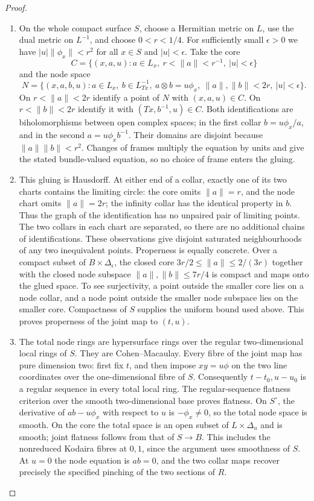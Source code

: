 \begin{proof}
\begin{enumerate}[label=\arabic*.,leftmargin=*]
\item On the whole compact surface $S$, choose a
Hermitian metric on $L$, use the dual metric on $L^{-1}$, and choose
$0<r<1/4$. For sufficiently small $\epsilon>0$ we have
$|u|\|\phi_x\|<r^2$ for all $x\in S$ and $|u|<\epsilon$.
Take the core
\[
 C=\{(x,a,u):a\in L_x,\ r<\|a\|<r^{-1},\ |u|<\epsilon\}
\]
and the node space
\begin{equation}
 N=\{(x,a,b,u):a\in L_x,\ b\in L^{-1}_{Tx},\
 a\otimes b=u\phi_x,\ \|a\|,\|b\|<2r,\ |u|<\epsilon\}.
\label{pub:I:eq:E1}
\end{equation}
On $r<\|a\|<2r$ identify a point of $N$ with $(x,a,u)\in C$.
On $r<\|b\|<2r$ identify it with $(Tx,b^{-1},u)\in C$.
Both identifications are biholomorphisms between open complex spaces;
in the first collar $b=u\phi_x/a$, and in the second
$a=u\phi_xb^{-1}$. Their domains are disjoint because
$\|a\|\|b\|<r^2$. Changes of frames multiply the equation by
units and give the stated bundle-valued equation, so no choice of
frame enters the gluing.

\item This gluing is Hausdorff. At either end of a collar, exactly one
of its two charts contains the limiting circle: the core omits
$\|a\|=r$, and the node chart omits $\|a\|=2r$; the infinity
collar has the identical property in $b$. Thus the graph of the
identification has no unpaired pair of limiting points. The two
collars in each chart are separated, so there are no additional
chains of identifications. These observations give disjoint
saturated neighbourhoods of any two inequivalent points. Properness
is equally concrete. Over a compact subset of $B\times\Delta_\epsilon$,
the closed core $3r/2\leq\|a\|\leq2/(3r)$ together with the
closed node subspace $\|a\|,\|b\|\leq7r/4$ is compact and maps
onto the glued space. To see surjectivity, a point outside the smaller
core lies on a node collar, and a node point outside the smaller
node subspace lies on the smaller core. Compactness of $S$ supplies
the uniform bound used above. This proves properness of the joint
map to $(t,u)$.

\item The total node rings are hypersurface rings over the regular
two-dimensional local rings of $S$. They are Cohen--Macaulay.
Every fibre of the joint map has pure dimension two: first fix
$t$, and then impose $xy=u\phi$ on the two line coordinates over
the one-dimensional fibre of $S$. Consequently $t-t_0,u-u_0$ is a
regular sequence in every total local ring. The regular-sequence
flatness criterion over the smooth two-dimensional base proves
flatness. On $S^\circ$, the derivative of $ab-u\phi_x$ with respect to $u$ is $-\phi_x\ne0$, so the total node space is smooth. On the core the total space is an open subset of $L\times\Delta_u$
and is smooth; joint flatness follows from that of $S\to B$. This includes the nonreduced Kodaira fibres
at $0,1$, since the argument uses smoothness of $S$. At $u=0$ the node equation is $ab=0$,
and the two collar maps recover precisely the specified pinching
of the two sections of $R$.


\end{enumerate}
\end{proof}
